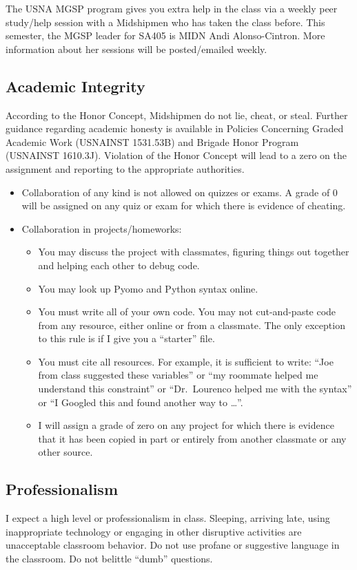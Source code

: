 \documentclass[letterpaper,hidelinks,oneside,11pt]{article}%
\begin{document}
The USNA MGSP program gives you extra help in the class via a weekly peer study/help session with a Midshipmen who has taken the class before. This semester, the MGSP leader for SA405 is MIDN Andi Alonso-Cintron. More information about her sessions will be posted/emailed weekly.

\subsection*{Academic Integrity}

According to the Honor Concept, Midshipmen do not lie, cheat, or steal. Further guidance regarding academic honesty is available in Policies Concerning Graded Academic Work (USNAINST 1531.53B) and Brigade Honor Program (USNAINST 1610.3J). Violation of the Honor Concept will lead to a zero on the assignment and reporting to the appropriate authorities. 
\begin{itemize}
	\item Collaboration of any kind is not allowed on quizzes or exams. A grade of 0 will be assigned on any quiz or exam for which there is evidence of cheating.
	\item Collaboration in projects/homeworks:
	\begin{itemize}
	\item You may discuss the project with classmates, figuring things out together and helping each other to debug code.
	\item You may look up Pyomo and Python syntax online.
	\item You must write all of your own code. You may not cut-and-paste code from any resource, either online or from a classmate. The only exception to this rule is if I give you a ``starter'' file.
	\item You must cite all resources. For example, it is sufficient to write: “Joe from class suggested these variables” or “my roommate helped me understand this constraint” or “Dr.\ Lourenco helped me with the syntax” or “I Googled this and found another way to …”.
	\item I will assign a grade of zero on any project for which there is evidence that it has been copied in part or entirely from another classmate or any other source.
	\end{itemize}
\end{itemize}

\subsection*{Professionalism}
I expect a high level or professionalism in class. Sleeping, arriving late, using inappropriate technology or engaging in other disruptive activities are unacceptable classroom behavior. Do not use profane or suggestive language in the classroom. Do not belittle ``dumb'' questions.
\end{document}

